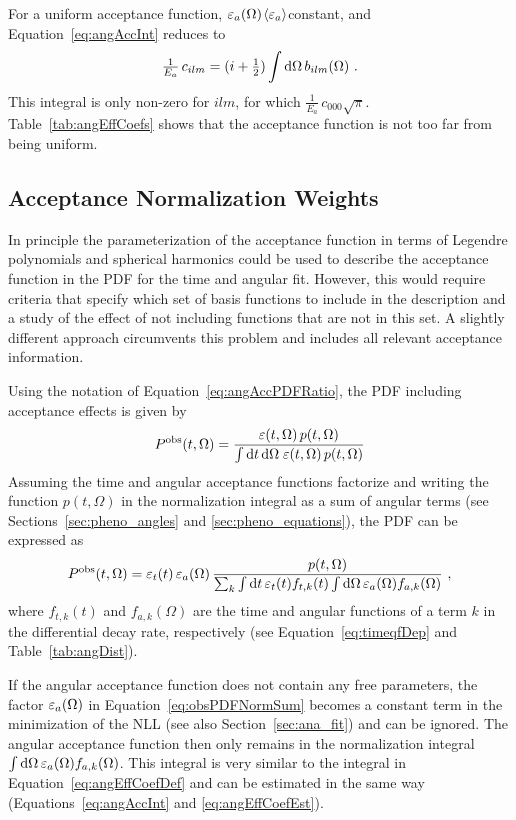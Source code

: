 For a uniform acceptance function, $\varepsilon_a(\Omega)$\texteq$\langle\varepsilon_a\rangle$\texteq constant, and Equation~\ref{eq:angAccInt} reduces to
\begin{equation}
  \tfrac{1}{E_a}\, c_{ilm} = (i+\tfrac{1}{2}) \int\mathrm{d}\Omega\,b_{ilm}(\Omega)\ .
\end{equation}
This integral is only non-zero for $i$\texteq$l$\texteq$m$, for which $\tfrac{1}{E_a}\,c_{000}$$\sqrt{\pi}$.
Table~\ref{tab:angEffCoefs} shows that the acceptance function is not too far from being uniform.


\subsection{Acceptance Normalization Weights}
\label{subsec:ana_angles_weights}

In principle the parameterization of the acceptance function in terms of Legendre polynomials and spherical harmonics could be used to
describe the acceptance function in the PDF for the time and angular fit. However, this would require criteria that specify which set of
basis functions to include in the description and a study of the effect of not including functions that are not in this set. A slightly
different approach circumvents this problem and includes all relevant acceptance information.

Using the notation of Equation~\ref{eq:angAccPDFRatio}, the PDF including acceptance effects is given by
\begin{equation}
  \label{eq:obsPDF}
  P^\text{obs}(t,\Omega) = \frac{\varepsilon(t,\Omega)\, p(t,\Omega)}{\int\mathrm{d} t\, \mathrm{d}\Omega\; \varepsilon(t,\Omega)\, p(t,\Omega)}
\end{equation}
Assuming the time and angular acceptance functions factorize and writing the function $p(t,\Omega)$ in the normalization integral as a sum
of angular terms (see Sections~\ref{sec:pheno_angles} and \ref{sec:pheno_equations}), the PDF can be expressed as
\begin{equation}
  \label{eq:obsPDFNormSum}
  P^\text{obs}(t,\Omega) = \efft\,\effa\, \frac{p(t,\Omega)}{\sum_k \int\ud t\, \efft f_{t,k}(t) \int\ud\Omega\, \effa f_{a,k}(\Omega)}\ ,
\end{equation}
where $f_{t,k}(t)$ and $f_{a,k}(\Omega)$ are the time and angular functions of a term $k$ in the differential decay rate, respectively (see
Equation~\ref{eq:timeqfDep} and Table~\ref{tab:angDist}).

If the angular acceptance function does not contain any free parameters, the factor $\varepsilon_a(\Omega)$ in Equation~\ref{eq:obsPDFNormSum} becomes a
constant term in the minimization of the NLL (see also Section~\ref{sec:ana_fit}) and can be ignored. The angular acceptance function then
only remains in the normalization integral $\int\mathrm{d}\Omega\, \varepsilon_a(\Omega) f_{a,k}(\Omega)$. This integral is very similar to the integral in
Equation~\ref{eq:angEffCoefDef} and can be estimated in the same way (Equations~\ref{eq:angAccInt} and \ref{eq:angEffCoefEst}).

